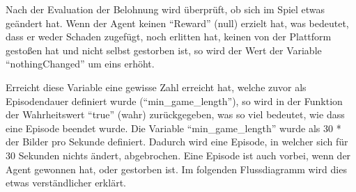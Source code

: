 Nach der Evaluation der Belohnung wird überprüft, ob sich im Spiel etwas geändert hat. Wenn der Agent keinen ``Reward'' (null) erzielt hat, was bedeutet, dass er weder Schaden zugefügt, noch erlitten hat, keinen von der Plattform gestoßen hat und nicht selbst gestorben ist, so wird der Wert der Variable ``nothingChanged'' um eins erhöht.

Erreicht diese Variable eine gewisse Zahl erreicht hat, welche zuvor als Episodendauer definiert wurde (``min\_game\_length''), so wird in der Funktion der Wahrheitswert ``true'' (wahr) zurückgegeben, was so viel bedeutet, wie dass eine Episode beendet wurde. Die Variable ``min\_game\_length'' wurde als 30 * der Bilder pro Sekunde definiert. Dadurch wird eine Episode, in welcher sich für 30 Sekunden nichts ändert, abgebrochen. Eine Episode ist auch vorbei, wenn der Agent gewonnen hat, oder gestorben ist.
\newpage
Im folgenden Flussdiagramm wird dies etwas verständlicher erklärt.

